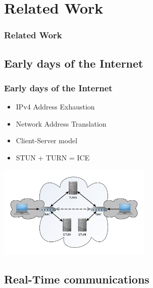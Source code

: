 \documentclass[compress]{beamer}
\begin{document}
\section{Related Work}\label{related}

\begin{frame}[t,shrink]
\frametitle{Related Work} 

\end{frame}

	\subsection{Early days of the Internet}\label{early}


  		\begin{frame}[c]
		\frametitle{Early days of the Internet}
		\begin{itemize}
		\item IPv4 Address Exhaustion
		\vfill
		\item Network Address Translation	
		\vfill
		\item Client-Server model
		\vfill
		\item STUN + TURN = ICE
		\end{itemize}
		\begin{flushright}

			\vspace*{-6\baselineskip}
			\includegraphics[width=0.55\textwidth]{figures/ice.pdf}
		\end{flushright}
		
		\end{frame}




	\subsection{Real-Time communications}\label{rtc}
\end{document}

